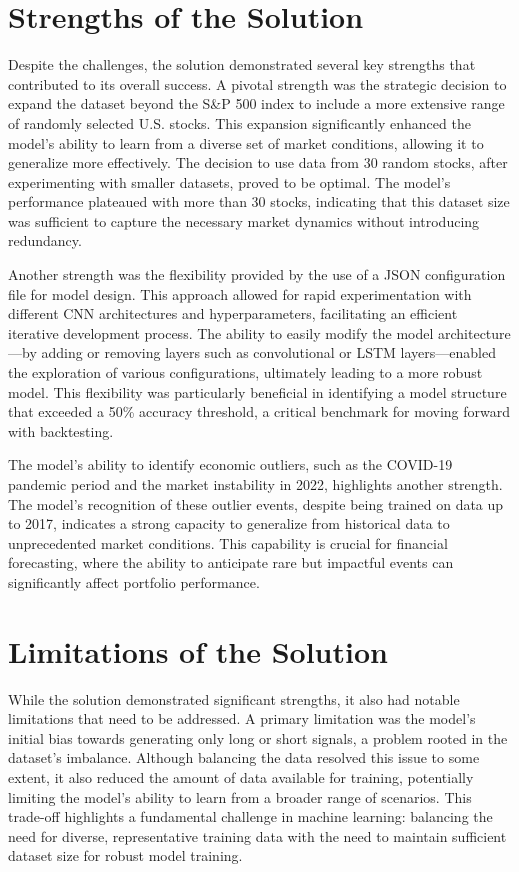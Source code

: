 \section{Strengths of the Solution}

Despite the challenges, the solution demonstrated several key strengths that contributed to its overall success. A pivotal strength was the strategic decision to expand the dataset beyond the S\&P 500 index to include a more extensive range of randomly selected U.S. stocks. This expansion significantly enhanced the model's ability to learn from a diverse set of market conditions, allowing it to generalize more effectively. The decision to use data from 30 random stocks, after experimenting with smaller datasets, proved to be optimal. The model’s performance plateaued with more than 30 stocks, indicating that this dataset size was sufficient to capture the necessary market dynamics without introducing redundancy.

Another strength was the flexibility provided by the use of a JSON configuration file for model design. This approach allowed for rapid experimentation with different CNN architectures and hyperparameters, facilitating an efficient iterative development process. The ability to easily modify the model architecture—by adding or removing layers such as convolutional or LSTM layers—enabled the exploration of various configurations, ultimately leading to a more robust model. This flexibility was particularly beneficial in identifying a model structure that exceeded a 50\% accuracy threshold, a critical benchmark for moving forward with backtesting.

The model's ability to identify economic outliers, such as the COVID-19 pandemic period and the market instability in 2022, highlights another strength. The model's recognition of these outlier events, despite being trained on data up to 2017, indicates a strong capacity to generalize from historical data to unprecedented market conditions. This capability is crucial for financial forecasting, where the ability to anticipate rare but impactful events can significantly affect portfolio performance.

\section{Limitations of the Solution}

While the solution demonstrated significant strengths, it also had notable limitations that need to be addressed. A primary limitation was the model's initial bias towards generating only long or short signals, a problem rooted in the dataset's imbalance. Although balancing the data resolved this issue to some extent, it also reduced the amount of data available for training, potentially limiting the model's ability to learn from a broader range of scenarios. This trade-off highlights a fundamental challenge in machine learning: balancing the need for diverse, representative training data with the need to maintain sufficient dataset size for robust model training.


